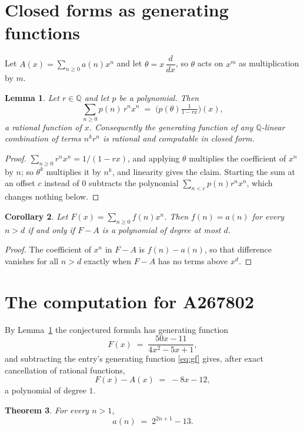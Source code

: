 \documentclass[11pt,a4paper]{article}
\theoremstyle{plain}
\newtheorem{theorem}{Theorem}
\newtheorem{lemma}[theorem]{Lemma}
\newtheorem{corollary}[theorem]{Corollary}
\theoremstyle{definition}
\begin{document}
\section{Closed forms as generating functions}

Let $A(x)=\sum_{n\ge 0}a(n)x^{n}$ and let $\theta=x\,\dfrac{d}{dx}$, so $\theta$
acts on $x^{m}$ as multiplication by $m$.

\begin{lemma}\label{lem:gf}
Let $r\in\mathbb{Q}$ and let $p$ be a polynomial. Then
\[
\sum_{n\ge0}p(n)\,r^{n}x^{n}\;=\;\bigl(p(\theta)\tfrac{1}{1-rx}\bigr)(x),
\]
a rational function of $x$. Consequently the generating function of any
$\mathbb{Q}$-linear combination of terms $n^{k}r^{n}$ is rational and computable in
closed form.
\end{lemma}

\begin{proof}
$\sum_{n\ge0}r^{n}x^{n}=1/(1-rx)$, and applying $\theta$ multiplies the coefficient of
$x^{n}$ by $n$; so $\theta^{k}$ multiplies it by $n^{k}$, and linearity gives the claim.
Starting the sum at an offset $c$ instead of $0$ subtracts the polynomial
$\sum_{n<c}p(n)r^{n}x^{n}$, which changes nothing below.
\end{proof}

\begin{corollary}\label{cor:criterion}
Let $F(x)=\sum_{n\ge 0}f(n)x^{n}$. Then $f(n)=a(n)$ for every $n>d$ if and only
if $F-A$ is a polynomial of degree at most $d$.
\end{corollary}

\begin{proof}
The coefficient of $x^{n}$ in $F-A$ is $f(n)-a(n)$, so that difference vanishes for all
$n>d$ exactly when $F-A$ has no terms above $x^{d}$.
\end{proof}

\section{The computation for A267802}

By Lemma~\ref{lem:gf} the conjectured formula has generating function
\[
F(x)\;=\;\frac{50 x - 11}{4 x^{2} - 5 x + 1} ,
\]
and subtracting the entry's generating function \eqref{eq:gf} gives, after exact
cancellation of rational functions,
\[
F(x)-A(x)\;=\;- 8 x - 12 ,
\]
a polynomial of degree $1$.

\begin{theorem}
For every $n>1$,
\[
a(n)\;=\;2^{2 n + 1} - 13 .
\]
\end{theorem}
\end{document}
